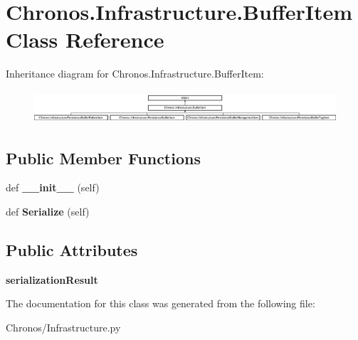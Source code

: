 \hypertarget{classChronos_1_1Infrastructure_1_1BufferItem}{}\section{Chronos.\+Infrastructure.\+Buffer\+Item Class Reference}
\label{classChronos_1_1Infrastructure_1_1BufferItem}
Inheritance diagram for Chronos.\+Infrastructure.\+Buffer\+Item\+:\begin{figure}[H]
\begin{center}
\leavevmode
\includegraphics[height=1.210375cm]{classChronos_1_1Infrastructure_1_1BufferItem}
\end{center}
\end{figure}
\subsection*{Public Member Functions}
\begin{DoxyCompactItemize}
\item 
def {\bfseries \+\_\+\+\_\+init\+\_\+\+\_\+} (self)
\item 
def {\bfseries Serialize} (self)
\end{DoxyCompactItemize}
\subsection*{Public Attributes}
\begin{DoxyCompactItemize}
\item 
{\bfseries serialization\+Result}
\end{DoxyCompactItemize}


The documentation for this class was generated from the following file\+:\begin{DoxyCompactItemize}
\item 
Chronos/Infrastructure.\+py\end{DoxyCompactItemize}

